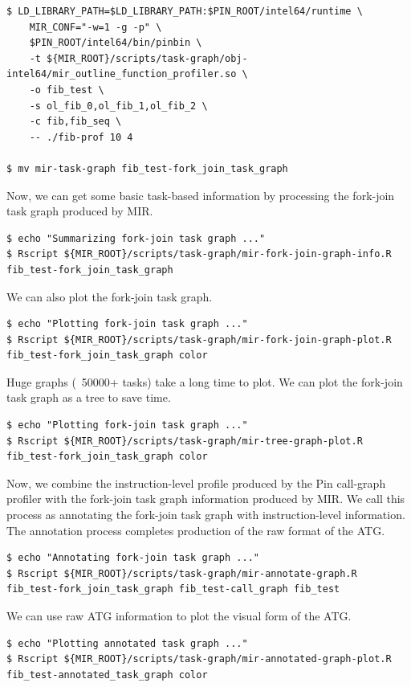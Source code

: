 \documentclass[11pt,a4paper,notitlepage]{article}
\begin{document}
\begin{lstlisting}[style=BashInputStyle]
$ LD_LIBRARY_PATH=$LD_LIBRARY_PATH:$PIN_ROOT/intel64/runtime \
    MIR_CONF="-w=1 -g -p" \
    $PIN_ROOT/intel64/bin/pinbin \
    -t ${MIR_ROOT}/scripts/task-graph/obj-intel64/mir_outline_function_profiler.so \
    -o fib_test \
    -s ol_fib_0,ol_fib_1,ol_fib_2 \
    -c fib,fib_seq \
    -- ./fib-prof 10 4

$ mv mir-task-graph fib_test-fork_join_task_graph
\end{lstlisting}

Now, we can get some basic task-based information by processing the fork-join task graph produced by MIR.
\begin{lstlisting}[style=BashInputStyle]
$ echo "Summarizing fork-join task graph ..."
$ Rscript ${MIR_ROOT}/scripts/task-graph/mir-fork-join-graph-info.R fib_test-fork_join_task_graph 
\end{lstlisting}

We can also plot the fork-join task graph. 
\begin{lstlisting}[style=BashInputStyle]
$ echo "Plotting fork-join task graph ..."
$ Rscript ${MIR_ROOT}/scripts/task-graph/mir-fork-join-graph-plot.R fib_test-fork_join_task_graph color
\end{lstlisting}

Huge graphs (~50000+ tasks) take a long time to plot. We can plot the fork-join task graph as a tree to save time.
\begin{lstlisting}[style=BashInputStyle]
$ echo "Plotting fork-join task graph ..."
$ Rscript ${MIR_ROOT}/scripts/task-graph/mir-tree-graph-plot.R fib_test-fork_join_task_graph color
\end{lstlisting}

Now, we combine the instruction-level profile produced by the Pin call-graph profiler with the fork-join task graph information produced by MIR. We call this process as annotating the fork-join task graph with instruction-level information. The annotation process completes production of the raw format of the ATG.

\begin{lstlisting}[style=BashInputStyle]
$ echo "Annotating fork-join task graph ..."
$ Rscript ${MIR_ROOT}/scripts/task-graph/mir-annotate-graph.R fib_test-fork_join_task_graph fib_test-call_graph fib_test
\end{lstlisting}

We can use raw ATG information to plot the visual form of the ATG.
\begin{lstlisting}[style=BashInputStyle]
$ echo "Plotting annotated task graph ..."
$ Rscript ${MIR_ROOT}/scripts/task-graph/mir-annotated-graph-plot.R fib_test-annotated_task_graph color
\end{lstlisting}
\end{document}
